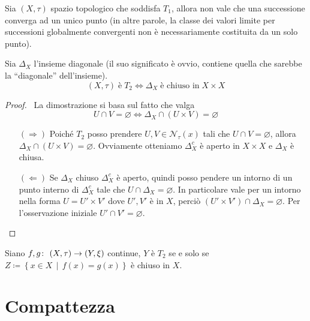 \begin{remark}
	Sia $(X, \tau)$ spazio topologico che soddisfa $T_1$, allora non vale che una successione converga ad un unico punto (in altre parole, la classe dei valori limite per successioni globalmente convergenti non è necessariamente costituita da un solo punto).
\end{remark}

\begin{theorem} Sia $\Delta_{X}$ l'insieme diagonale (il suo significato è ovvio, contiene quella che sarebbe la \enquote{diagonale} dell'insieme).
	\begin{equation*}
	(X, \tau) \; \text{è} \; T_2 \Leftrightarrow \Delta_{X} \; \text{è chiuso in} \; X \times X
	\end{equation*}
\end{theorem} 
\begin{proof} \
	La dimostrazione si basa sul fatto che valga 
	\begin{equation*}
	U \cap V = \varnothing \Leftrightarrow \Delta_X \cap (U \times V) = \varnothing
	\end{equation*}
	\begin{enumerate}
		\item[$(\Rightarrow)$] Poiché $T_2$ posso prendere $U, V \in \mathcal{N}_\tau(x)$ tali che $U \cap V = \varnothing$, allora $\Delta_X \cap (U \times V) = \varnothing$. Ovviamente otteniamo $\Delta_X^c$ è aperto in $X\times X$ e $\Delta_X$ è chiusa. 
		\item[$(\Leftarrow)$] Se $\Delta_X$ chiuso $\Delta^c_X$ è aperto, quindi posso pendere un intorno di un punto interno di $\Delta^c_X$ tale che $U \cap \Delta_X = \varnothing$. In particolare vale per un intorno nella forma $U = U' \times V'$ dove $U', V'$ è in $X$, perciò $(U' \times V') \cap \Delta_X = \varnothing$. Per l'osservazione iniziale $U' \cap V' = \varnothing$.
	\end{enumerate}
\end{proof}

\begin{theorem}
	Siano $f,g \colon\ (X,\tau) \rightarrow (Y,\xi)$ continue, $Y$ è $T_2$ se e solo se $Z \coloneqq \left\{x \in X \,\middle|\, f(x) = g(x) \right\}$ è chiuso in $X$.
\end{theorem}



\section{Compattezza}
